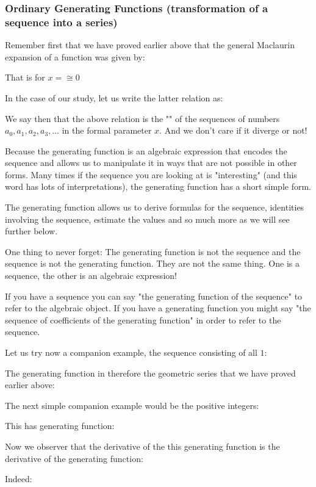 	\subsubsection{Ordinary Generating Functions (transformation of a sequence into a series)}
	Remember first that we have proved earlier above that the general Maclaurin expansion of a function was given by:
	
	That is for $x=\cong 0$
	
	In the case of our study, let us write the latter relation as:
	
	We say then that the above relation is the "" of the sequences of numbers $a_0,a_1,a_2,a_3,\ldots$ in the formal parameter $x$. And we don't care if it diverge or not!
	
	Because the generating function is an algebraic expression that encodes the sequence and allows us to manipulate it in ways that are not possible in other forms. Many times if the sequence you are looking at is "interesting" (and this word has lots of interpretations), the generating function has a short simple form.

	The generating function allows us to derive formulas for the sequence, identities involving the sequence, estimate the values and so much more as we will see further below.	
	
	One thing to never forget: The generating function is not the sequence and the sequence is not the generating function. They are not the same thing. One is a sequence, the other is an algebraic expression!

	If you have a sequence you can say "the generating function of the sequence" to refer to the algebraic object. If you have a generating function you might say "the sequence of coefficients of the generating function" in order to refer to the sequence.
	
	Let us try now a companion example, the sequence consisting of all $1$:
	
	The generating function in therefore the geometric series that we have proved earlier above:
	
	The next simple companion example would be the positive integers:
	
	This has generating function:
	
	Now we observer that the derivative of the this generating function is the derivative of the generating function:
	
	Indeed:
	
